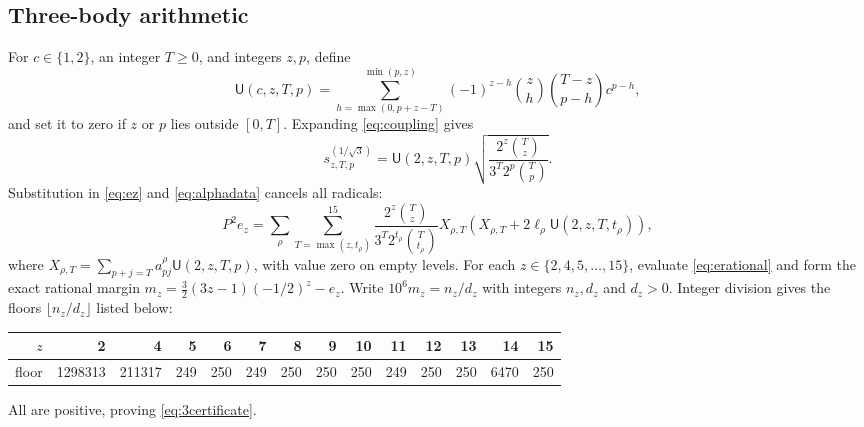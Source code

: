 \subsection{Three-body arithmetic}
\label{app:three-arithmetic}
For $c\in\{1,2\}$, an integer $T\ge0$, and integers $z,p$, define
\begin{equation}\label{eq:U}
 \mathsf U(c,z,T,p)=
 \sum_{h=\max(0,p+z-T)}^{\min(p,z)}
 (-1)^{z-h}\binom zh\binom{T-z}{p-h}c^{p-h},
\end{equation}
and set it to zero if $z$ or $p$ lies outside $[0,T]$. Expanding \eqref{eq:coupling} gives
\[
 s^{(1/\sqrt3)}_{z,T,p}=\mathsf U(2,z,T,p)
 \sqrt{\frac{2^z\binom Tz}{3^T2^p\binom Tp}}.
\]
Substitution in \eqref{eq:ez} and \eqref{eq:alphadata} cancels all radicals:
\begin{equation}\label{eq:erational}
 P^2e_z=\sum_\rho\sum_{T=\max(z,t_\rho)}^{15}
 \frac{2^z\binom Tz}{3^T2^{t_\rho}\binom T{t_\rho}}
 X_{\rho,T}\left(X_{\rho,T}+2\ell_\rho\mathsf U(2,z,T,t_\rho)\right),
\end{equation}
where $X_{\rho,T}=\sum_{p+j=T}a^\rho_{pj}\mathsf U(2,z,T,p)$, with value zero on empty levels. For each $z\in\{2,4,5,\ldots,15\}$, evaluate \eqref{eq:erational} and form the exact rational margin
$m_z=\frac32(3z-1)(-1/2)^z-e_z$. Write $10^6m_z=n_z/d_z$ with integers $n_z,d_z$ and $d_z>0$. Integer division gives the floors $\lfloor n_z/d_z\rfloor$ listed below:
\begin{center}
\begin{tabular}{rrrrrrrrrrrrrr}
\toprule
$z$&2&4&5&6&7&8&9&10&11&12&13&14&15\\
\midrule
floor&1298313&211317&249&250&249&250&250&250&249&250&250&6470&250\\
\bottomrule
\end{tabular}
\end{center}
All are positive, proving \eqref{eq:3certificate}.

